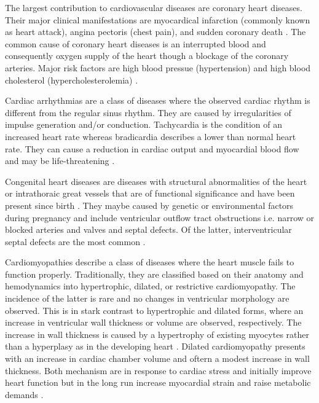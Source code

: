 The largest contribution to cardiovascular diseases are coronary heart diseases. Their major clinical manifestations are myocardical infarction (commonly known as heart attack), angina pectoris (chest pain), and sudden coronary death \citep{Wong2014}. The common cause of coronary heart diseases is an interrupted blood and consequently oxygen supply of the heart though a blockage of the coronary arteries. Major risk factors are high blood pressue (hypertension) and high blood cholesterol (hypercholesterolemia) \citep{Mackay2004}.

Cardiac arrhythmias are a class of diseases where the observed cardiac rhythm is different from the regular sinus rhythm. They are caused by irregularities of impulse generation and/or conduction. Tachycardia is the condition of an increased heart rate whereas bradicardia describes a lower than normal heart rate. They can cause a reduction in cardiac output and myocardial blood flow and may be life-threatening \citep{Durham2002}.

Congenital heart diseases are diseases with structural abnormalities of the heart or intrathoraic great vessels that are of functional significance and have been present since birth \citep{Mitchell1970}. They maybe caused by genetic or environmental factors during pregnancy and include ventricular outflow tract  obstructions i.e. narrow or blocked arteries and valves and septal defects. Of the latter, interventricular septal defects are the most common \citep{Hoffman2005}.


Cardiomyopathies describe a class of diseases where the heart muscle fails to function properly. Traditionally, they are classified based on their anatomy and hemodynamics into hypertrophic, dilated, or restrictive cardiomyopathy. The incidence of the latter is rare and no changes in ventricular morphology are observed. This is in stark contrast to hypertrophic and dilated forms, where an increase in ventricular wall thickness or volume are observed, respectively. The increase in wall thickness is caused by a hypertrophy of existing myocytes rather than a hyperplasy as in the developing heart \citep{Lorell2000}. Dilated cardiomyopathy presents with an increase in cardiac chamber volume and oftern a modest increase in wall thickness. Both mechanism are in response to cardiac stress and initially improve heart function but in the long run increase myocardial strain and raise metabolic demands \citep{Seidman2011}.

